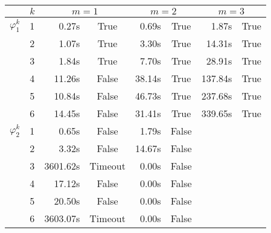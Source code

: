 \begin{table}
\centering
\begin{tabular}{ccrcrcrc}
  \toprule
  & $k$ & \multicolumn{2}{c}{$m = 1$} & \multicolumn{2}{c}{$m = 2$} & \multicolumn{2}{c}{$m = 3$}  \\\midrule
  $\varphi_1^k$ & 1 &       0.27s & True    &       0.69s & True    &       1.87s & True   \\
 & 2 &       1.07s & True    &       3.30s & True    &      14.31s & True   \\
 & 3 &       1.84s & True    &       7.70s & True    &      28.91s & True   \\
 & 4 &      11.26s & False   &      38.14s & True    &     137.84s & True   \\
 & 5 &      10.84s & False   &      46.73s & True    &     237.68s & True   \\
 & 6 &      14.45s & False   &      31.41s & True    &     339.65s & True   \\


  
  \midrule
  $\varphi_2^k$ & 1 &    0.65s & False   &     1.79s & False  \\
               & 2 &     3.32s & False   &    14.67s & False  \\
               & 3 &  3601.62s & Timeout &     0.00s & False  \\
               & 4 &    17.12s & False   &     0.00s & False  \\
               & 5 &    20.50s & False   &     0.00s & False  \\
               & 6 &  3603.07s & Timeout &     0.00s & False  \\


\bottomrule
\end{tabular}
  \label{tab:results}
\end{table}



